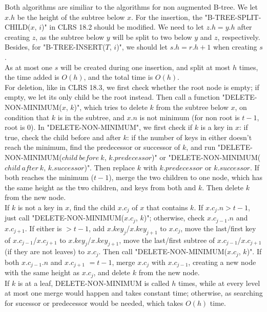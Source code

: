 \documentclass{6046}
\begin{document}
Both algorithms are similiar to 
the algorithms for non augmented B-tree. 
We let $x.h$ be the height of the subtree below $x$. 
For the insertion, 
the "B-TREE-SPLIT-CHILD($x$, $i$)" 
in CLRS 18.2 should be modified.  
We need to let $z.h = y.h$ after creating 
$z$, as the subtree below $y$ 
will be split to two below 
$y$ and $z$, respectively. 
Besides, 
for "B-TREE-INSERT($T$, $i$)", 
we should let $s.h = r.h +1$ when 
creating $s$.  
\\

As at most one $s$ will be created 
during one insertion, 
and split at most $h$ times, 
the time added is $O(h)$, 
and the total time is $O(h)$. 
\\

For deletion, 
like in CLRS 18.3, we first 
check whether the root node is empty; 
if empty, we let its only child 
be the root instead. 
Then call a function 
"DELETE-NON-MINIMUM($x$, $k$)", 
which tries to delete 
$k$ from the subtree below $x$, 
on condition that $k$ is in the subtree, 
and $x.n$ is not minimum (for non root is $t-1$, root is $0$). 
In "DELETE-NON-MINIMUM", 
we first check if $k$ is a key in $x$:  
if true, check the child before and after $k$: 
if the number of keys in either doesn't reach the minimum, 
find the predecessor or successor of $k$, 
and run
"DELETE-NON-MINIMUM($child\ before\ k$, $k.predecessor$)" 
or "DELETE-NON-MINIMUM($child\ after\ k$, $k.successor$)". 
Then replace $k$ with $k.predecessor$ or $k.successor$. 
If both reaches the minimum ($t-1$), 
merge the two children to one node, 
which has the same height as the two children, 
and keys from both and $k$. 
Then delete $k$ from the new node. 
\\
If $k$ is not a key in $x$, 
find the child $x.c_j$ of $x$ that contains $k$. 
If $x.c_j.n > t-1$, 
just call "DELETE-NON-MINIMUM($x.c_j$, $k$)"; 
otherwise, 
check 
$x.c_{j-1}.n$ and $x.c_{j+1}$. 
If either is $>t-1$, 
add $x.key_j$/$x.key_{j+1}$ to $x.c_j$, 
move the last/first key of 
$x.c_{j-1}$/$x.c_{j+1}$ to 
$x.key_j$/$x.key_{j+1}$, 
move the last/first subtree  of 
$x.c_{j-1}$/$x.c_{j+1}$ (if they are not leaves) to 
$x.c_j$. 
Then call "DELETE-NON-MINIMUM($x.c_j$, $k$)". 
If both 
$x.c_{j-1}.n$ and $x.c_{j+1}$ 
$=t-1$, 
merge $x.c_j$ with $x.c_{j-1}$, 
creating a new node with the same height as 
$x.c_j$, 
and delete $k$ from the new node. 
\\

If $k$ is at a leaf, 
DELETE-NON-MINIMUM is called $h$ times, 
while at every level at most one merge would happen and takes constant time; 
otherwise, as searching for sucessor or predecessor would be needed, 
which takes $O(h)$ time. 
\\
\end{document}
